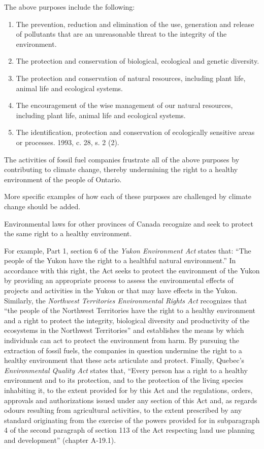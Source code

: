 The above purposes include the following:
\begin{enumerate}
	\item The prevention, reduction and elimination of the use, generation and release of pollutants that are an unreasonable threat to the integrity of the environment.
	\item The protection and conservation of biological, ecological and genetic diversity.
	\item The protection and conservation of natural resources, including plant life, animal life and ecological systems.
	\item The encouragement of the wise management of our natural resources, including plant life, animal life and ecological systems.
	\item The identification, protection and conservation of ecologically sensitive areas or processes.  1993, c. 28, s. 2 (2). 
\end{enumerate}



The activities of fossil fuel companies frustrate all of the above purposes by contributing to climate change, thereby undermining the right to a healthy environment of the people of Ontario.

\begin{vcom}
	More specific examples of how each of these purposes are challenged by climate change should be added.
\end{vcom}


Environmental laws for other provinces of Canada recognize and seek to protect the same right to a healthy environment.  



For example, Part 1, section 6 of the \emph{Yukon Environment Act} states that: ``The people of the Yukon have the right to a healthful natural environment.''   
In accordance with this right, the Act seeks to protect the environment of the Yukon by providing an appropriate process to assess the environmental effects of projects and activities in the Yukon or that may have effects in the Yukon. Similarly, the \emph{Northwest Territories Environmental Rights Act} recognizes that ``the people of the Northwest Territories have the right to a healthy environment and a right to protect the integrity, biological diversity and productivity of the ecosystems in the Northwest Territories'' and establishes the means by which individuals can act to protect the environment from harm. By pursuing the extraction of fossil fuels, the companies in question undermine the right to a healthy environment that these acts articulate and protect. Finally, Quebec’s \emph{Environmental Quality Act} states that, ``Every person has a right to a healthy environment and to its protection, and to the protection of the living species inhabiting it, to the extent provided for by this Act and the regulations, orders, approvals and authorizations issued under any section of this Act and, as regards odours resulting from agricultural activities, to the extent prescribed by any standard originating from the exercise of the powers provided for in subparagraph 4 of the second paragraph of section 113 of the Act respecting land use planning and development'' (chapter A-19.1).  

